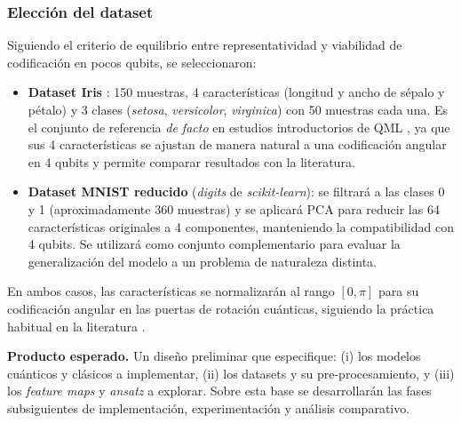 \documentclass[a4paper,10pt,twocolumn]{article}
\begin{document}
\subsubsection{Elecci\'on del dataset}
Siguiendo el criterio de equilibrio entre representatividad y viabilidad
de codificaci\'on en pocos qubits, se seleccionaron:

\begin{itemize}
    \item \textbf{Dataset Iris} \citep{fisher1936}: 150 muestras,
    4 caracter\'isticas (longitud y ancho de s\'epalo y p\'etalo) y
    3 clases (\textit{setosa}, \textit{versicolor},
    \textit{virginica}) con 50 muestras cada una. Es el conjunto de
    referencia \emph{de facto} en estudios introductorios de QML
    \citep{havlicek2019}, ya que sus 4 caracter\'isticas se ajustan de
    manera natural a una codificaci\'on angular en 4 qubits y permite
    comparar resultados con la literatura.

    \item \textbf{Dataset MNIST reducido} (\textit{digits} de
    \textit{scikit-learn}): se filtrar\'a a las clases 0 y 1
    (aproximadamente 360 muestras) y se aplicar\'a PCA para reducir las
    64 caracter\'isticas originales a 4 componentes, manteniendo la
    compatibilidad con 4 qubits. Se utilizar\'a como conjunto
    complementario para evaluar la generalizaci\'on del modelo a un
    problema de naturaleza distinta.
\end{itemize}

\noindent En ambos casos, las caracter\'isticas se normalizar\'an al
rango $[0, \pi]$ para su codificaci\'on angular en las puertas de
rotaci\'on cu\'anticas, siguiendo la pr\'actica habitual en la
literatura \citep{schuld2019, havlicek2019}.

\medskip
\noindent\textbf{Producto esperado.}
Un dise\~no preliminar que especifique: (i) los modelos cu\'anticos y
cl\'asicos a implementar, (ii) los datasets y su pre-procesamiento, y
(iii) los \textit{feature maps} y \textit{ansatz} a explorar. Sobre
esta base se desarrollar\'an las fases subsiguientes de
implementaci\'on, experimentaci\'on y an\'alisis comparativo.
\end{document}
